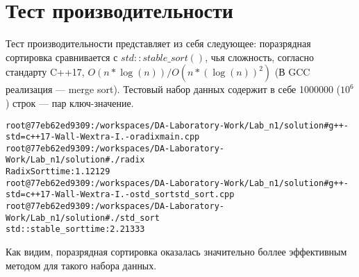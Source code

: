 \section{Тест производительности}

Тест производительности представляет из себя следующее: поразрядная сортировка сравнивается с $std::stable\_sort()$, чья сложность, согласно стандарту C++17, $O(n*\log(n))/O(n*(\log(n))^{2})$ (В GCC реализация --- merge sort).
Тестовый набор данных содержит в себе 1000000 ($10^{6}$) строк --- пар ключ-значение.

\begin{alltt}
root@77eb62ed9309:/workspaces/DA-Laboratory-Work/Lab_n1/solution# g++ -std=c++17 -Wall -Wextra -I. -o radix main.cpp       
root@77eb62ed9309:/workspaces/DA-Laboratory-Work/Lab_n1/solution# ./radix
RadixSort time: 1.12129
root@77eb62ed9309:/workspaces/DA-Laboratory-Work/Lab_n1/solution# g++ -std=c++17 -Wall -Wextra -I. -o std_sort std_sort.cpp 
root@77eb62ed9309:/workspaces/DA-Laboratory-Work/Lab_n1/solution# ./std_sort 
std::stable_sort time: 2.21333
\end{alltt}

Как видим, поразрядная сортировка оказалась значительно боллее эффективным методом для такого набора данных.

\pagebreak

